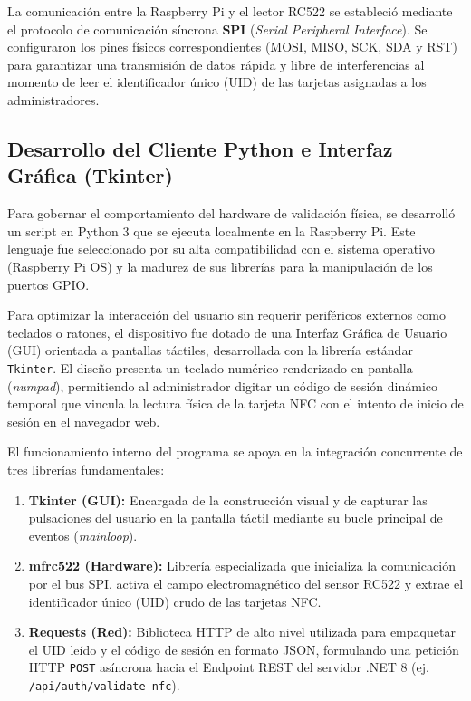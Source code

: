 La comunicación entre la Raspberry Pi y el lector RC522 se estableció mediante el protocolo de comunicación síncrona \textbf{SPI} (\textit{Serial Peripheral Interface}). Se configuraron los pines físicos correspondientes (MOSI, MISO, SCK, SDA y RST) para garantizar una transmisión de datos rápida y libre de interferencias al momento de leer el identificador único (UID) de las tarjetas asignadas a los administradores.

\subsection{Desarrollo del Cliente Python e Interfaz Gráfica (Tkinter)}
Para gobernar el comportamiento del hardware de validación física, se desarrolló un script en Python 3 que se ejecuta localmente en la Raspberry Pi. Este lenguaje fue seleccionado por su alta compatibilidad con el sistema operativo (Raspberry Pi OS) y la madurez de sus librerías para la manipulación de los puertos GPIO.

Para optimizar la interacción del usuario sin requerir periféricos externos como teclados o ratones, el dispositivo fue dotado de una Interfaz Gráfica de Usuario (GUI) orientada a pantallas táctiles, desarrollada con la librería estándar \texttt{Tkinter}. El diseño presenta un teclado numérico renderizado en pantalla (\textit{numpad}), permitiendo al administrador digitar un código de sesión dinámico temporal que vincula la lectura física de la tarjeta NFC con el intento de inicio de sesión en el navegador web.

El funcionamiento interno del programa se apoya en la integración concurrente de tres librerías fundamentales:
\begin{enumerate}
	\item \textbf{Tkinter (GUI):} Encargada de la construcción visual y de capturar las pulsaciones del usuario en la pantalla táctil mediante su bucle principal de eventos (\textit{mainloop}).
	\item \textbf{mfrc522 (Hardware):} Librería especializada que inicializa la comunicación por el bus SPI, activa el campo electromagnético del sensor RC522 y extrae el identificador único (UID) crudo de las tarjetas NFC.
	\item \textbf{Requests (Red):} Biblioteca HTTP de alto nivel utilizada para empaquetar el UID leído y el código de sesión en formato JSON, formulando una petición HTTP \texttt{POST} asíncrona hacia el Endpoint REST del servidor .NET 8 (ej. \texttt{/api/auth/validate-nfc}).
\end{enumerate}

